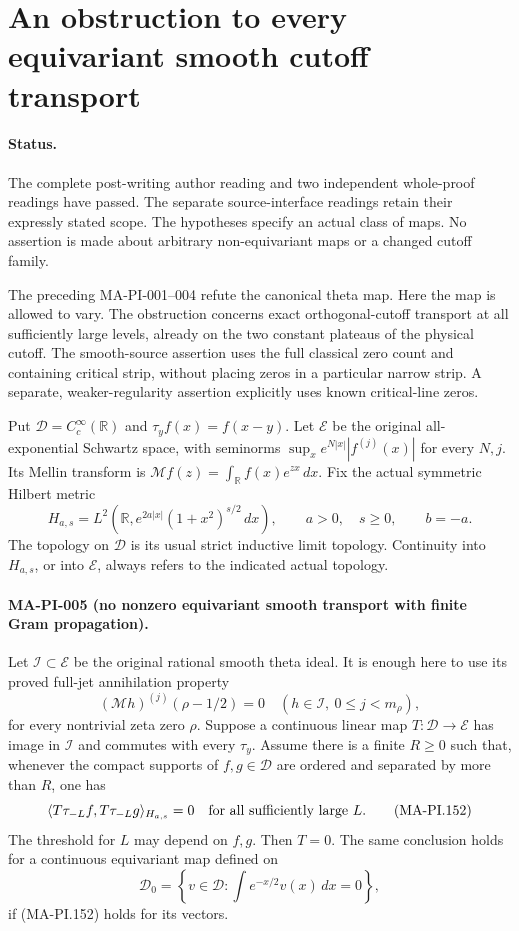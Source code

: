 \section{An obstruction to every equivariant smooth cutoff transport}
\label{sec:equivariant-cutoff-obstruction}

\paragraph{Status.}
The complete post-writing author reading and two independent
whole-proof readings have passed.  The separate source-interface
readings retain their expressly stated scope.
The hypotheses specify an actual class of maps.  No assertion is
made about arbitrary non-equivariant maps or a changed cutoff family.

The preceding MA-PI-001--004 refute the canonical theta map.
Here the map is allowed to vary.  The obstruction concerns exact
orthogonal-cutoff transport at all sufficiently large levels,
already on the two constant plateaus of the physical cutoff.
The smooth-source assertion uses the full classical zero count
and containing critical strip, without placing zeros in a
particular narrow strip.  A separate,
weaker-regularity assertion explicitly uses known critical-line zeros.

Put $\mathcal D=C_c^\infty(\mathbb R)$ and
$\tau_yf(x)=f(x-y)$.  Let $\mathcal E$ be the original
all-exponential Schwartz space, with seminorms
$\sup_x e^{N|x|}|f^{(j)}(x)|$ for every $N,j$.
Its Mellin transform is
$\mathcal Mf(z)=\int_{\mathbb R}f(x)e^{zx}\,dx$.
Fix the actual symmetric Hilbert metric
\[
 H_{a,s}=L^2(\mathbb R,e^{2a|x|}(1+x^2)^{s/2}\,dx),
 \qquad a>0,\quad s\ge0,
 \qquad b=-a.
 \tag{MA-PI.150}
\]
The topology on $\mathcal D$ is its usual strict inductive
limit topology.  Continuity into $H_{a,s}$, or into
$\mathcal E$, always refers to the indicated actual topology.

\paragraph{MA-PI-005 (no nonzero equivariant smooth transport with finite Gram propagation).}
Let $\mathscr I\subset\mathcal E$ be the original rational
smooth theta ideal.  It is enough here to use its proved
full-jet annihilation property
\[
 (\mathcal Mh)^{(j)}(\rho-1/2)=0
 \quad(h\in\mathscr I,\ 0\le j<m_\rho),
 \tag{MA-PI.151}
\]
for every nontrivial zeta zero $\rho$.
Suppose a continuous linear map $T:\mathcal D\to\mathcal E$
has image in $\mathscr I$ and commutes with every $\tau_y$.
Assume there is a finite $R\ge0$ such that, whenever the compact
supports of $f,g\in\mathcal D$ are ordered and separated by
more than $R$, one has
\[
 \langle T\tau_{-L}f,T\tau_{-L}g\rangle_{H_{a,s}}=0
 \quad\hbox{for all sufficiently large $L$}.
 \tag{MA-PI.152}
\]
The threshold for $L$ may depend on $f,g$.  Then $T=0$.
The same conclusion holds for a continuous equivariant map
defined on
\[
 \mathcal D_0=\left\{v\in\mathcal D:
                  \int e^{-x/2}v(x)\,dx=0\right\},
 \tag{MA-PI.153}
\]
if (MA-PI.152) holds for its vectors.

